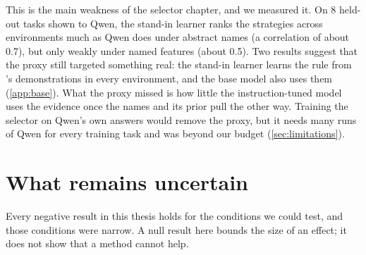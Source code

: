 This is the main weakness of the selector chapter, and we measured it. On 8 held-out tasks shown to Qwen, the stand-in learner ranks the strategies across environments much as Qwen does under abstract names (a correlation of about 0.7), but only weakly under named features (about 0.5). Two results suggest that the proxy still targeted something real: the stand-in learner learns the rule from \sata's demonstrations in every environment, and the base model also uses them (\autoref{app:base}). What the proxy missed is how little the instruction-tuned model uses the evidence once the names and its prior pull the other way. Training the selector on Qwen's own answers would remove the proxy, but it needs many runs of Qwen for every training task and was beyond our budget (\autoref{sec:limitations}).

\section{What remains uncertain}
\label{sec:limitations}

Every negative result in this thesis holds for the conditions we could test, and those conditions were narrow. A null result here bounds the size of an effect; it does not show that a method cannot help.

